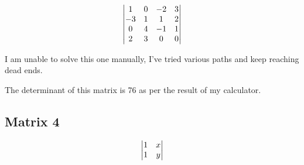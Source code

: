 \[
	\genericmat{v}{1 & 0 & -2 & 3 \\ -3 & 1 & 1 & 2 \\ 0 & 4 & -1 & 1 \\ 2 & 3 & 0 & 0}
\]

I am unable to solve this one manually, I've tried various paths and keep reaching dead ends.

The determinant of this matrix is 76 as per the result of my calculator. 

\subsection{Matrix 4}

\[
	\genericmat{v}{1 & x \\ 1 & y}
\]
